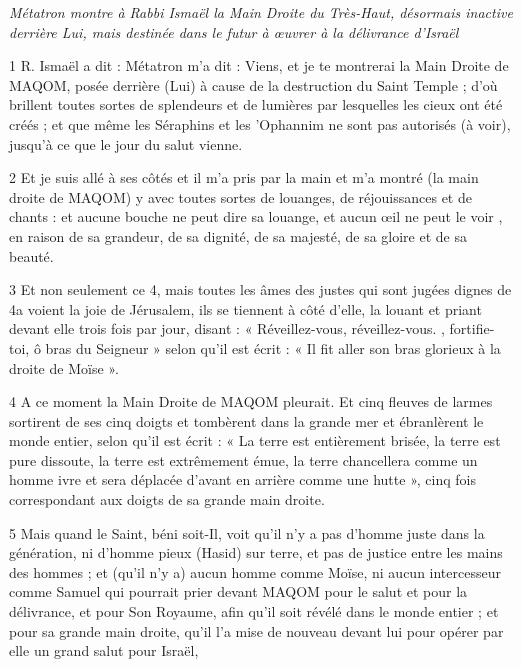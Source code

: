 
\par \textit{Métatron montre à Rabbi Ismaël la Main Droite du Très-Haut, désormais inactive derrière Lui, mais destinée dans le futur à œuvrer à la délivrance d'Israël}

\par 1 R. Ismaël a dit : Métatron m'a dit : Viens, et je te montrerai la Main Droite de MAQOM, posée derrière (Lui) à cause de la destruction du Saint Temple ; d'où brillent toutes sortes de splendeurs et de lumières par lesquelles les cieux ont été créés ; et que même les Séraphins et les 'Ophannim ne sont pas autorisés (à voir), jusqu'à ce que le jour du salut vienne.

\par 2 Et je suis allé à ses côtés et il m'a pris par la main et m'a montré (la main droite de MAQOM) y avec toutes sortes de louanges, de réjouissances et de chants : et aucune bouche ne peut dire sa louange, et aucun œil ne peut le voir , en raison de sa grandeur, de sa dignité, de sa majesté, de sa gloire et de sa beauté.

\par 3 Et non seulement ce 4, mais toutes les âmes des justes qui sont jugées dignes de 4a voient la joie de Jérusalem, ils se tiennent à côté d'elle, la louant et priant devant elle trois fois par jour, disant : « Réveillez-vous, réveillez-vous. , fortifie-toi, ô bras du Seigneur » selon qu'il est écrit : « Il fit aller son bras glorieux à la droite de Moïse ».

\par 4 A ce moment la Main Droite de MAQOM pleurait. Et cinq fleuves de larmes sortirent de ses cinq doigts et tombèrent dans la grande mer et ébranlèrent le monde entier, selon qu'il est écrit : « La terre est entièrement brisée, la terre est pure dissoute, la terre est extrêmement émue, la terre chancellera comme un homme ivre et sera déplacée d'avant en arrière comme une hutte », cinq fois correspondant aux doigts de sa grande main droite.

\par 5 Mais quand le Saint, béni soit-Il, voit qu'il n'y a pas d'homme juste dans la génération, ni d'homme pieux (Hasid) sur terre, et pas de justice entre les mains des hommes ; et (qu'il n'y a) aucun homme comme Moïse, ni aucun intercesseur comme Samuel qui pourrait prier devant MAQOM pour le salut et pour la délivrance, et pour Son Royaume, afin qu'il soit révélé dans le monde entier ; et pour sa grande main droite, qu'il l'a mise de nouveau devant lui pour opérer par elle un grand salut pour Israël,

